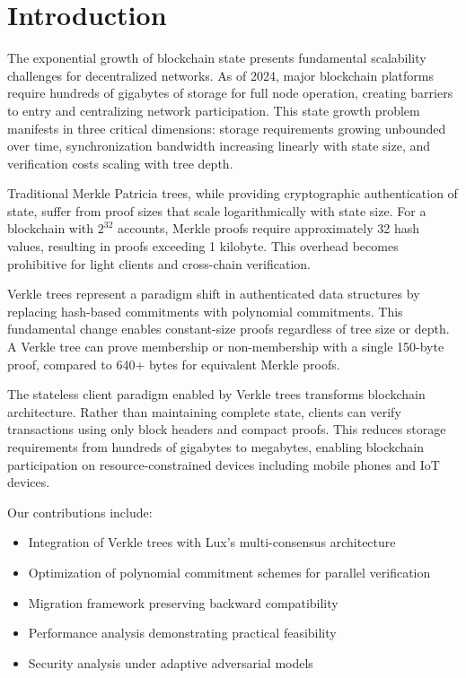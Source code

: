 \section{Introduction}


The exponential growth of blockchain state presents fundamental scalability challenges for decentralized networks. As of 2024, major blockchain platforms require hundreds of gigabytes of storage for full node operation, creating barriers to entry and centralizing network participation. This state growth problem manifests in three critical dimensions: storage requirements growing unbounded over time, synchronization bandwidth increasing linearly with state size, and verification costs scaling with tree depth.

Traditional Merkle Patricia trees, while providing cryptographic authentication of state, suffer from proof sizes that scale logarithmically with state size. For a blockchain with $2^{32}$ accounts, Merkle proofs require approximately 32 hash values, resulting in proofs exceeding 1 kilobyte. This overhead becomes prohibitive for light clients and cross-chain verification.

Verkle trees represent a paradigm shift in authenticated data structures by replacing hash-based commitments with polynomial commitments. This fundamental change enables constant-size proofs regardless of tree size or depth. A Verkle tree can prove membership or non-membership with a single 150-byte proof, compared to 640+ bytes for equivalent Merkle proofs.

The stateless client paradigm enabled by Verkle trees transforms blockchain architecture. Rather than maintaining complete state, clients can verify transactions using only block headers and compact proofs. This reduces storage requirements from hundreds of gigabytes to megabytes, enabling blockchain participation on resource-constrained devices including mobile phones and IoT devices.

Our contributions include:
\begin{itemize}
    \item Integration of Verkle trees with Lux's multi-consensus architecture
    \item Optimization of polynomial commitment schemes for parallel verification
    \item Migration framework preserving backward compatibility
    \item Performance analysis demonstrating practical feasibility
    \item Security analysis under adaptive adversarial models
\end{itemize}


